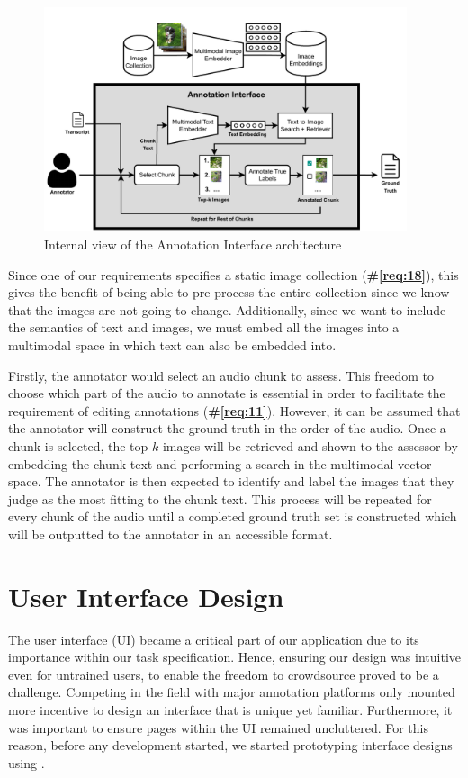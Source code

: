 \documentclass{l4proj}
\begin{document}
\begin{figure}[h]
    \centering
    \includegraphics[width=0.95\textwidth]{figures/annotation_interface.pdf}
    \caption{Internal view of the Annotation Interface architecture}
    \label{fig:annotation_interface}
\end{figure}

Since one of our requirements specifies a static image collection (\textbf{\#\ref{req:18}}), this gives the benefit of being able to pre-process the entire collection since we know that the images are not going to change. Additionally, since we want to include the semantics of text and images, we must embed all the images into a multimodal space in which text can also be embedded into.

Firstly, the annotator would select an audio chunk to assess. This freedom to choose which part of the audio to annotate is essential in order to facilitate the requirement of editing annotations (\textbf{\#\ref{req:11}}). However, it can be assumed that the annotator will construct the ground truth in the order of the audio. Once a chunk is selected, the top-$k$ images will be retrieved and shown to the assessor by embedding the chunk text and performing a search in the multimodal vector space. The annotator is then expected to identify and label the images that they judge as the most fitting to the chunk text. This process will be repeated for every chunk of the audio until a completed ground truth set is constructed which will be outputted to the annotator in an accessible format.


\section{User Interface Design}
The user interface (UI) became a critical part of our application due to its importance within our task specification. Hence, ensuring our design was intuitive even for untrained users, to enable the freedom to crowdsource proved to be a challenge. Competing in the field with major annotation platforms only mounted more incentive to design an interface that is unique yet familiar. Furthermore, it was important to ensure pages within the UI remained uncluttered. For this reason, before any development started, we started prototyping interface designs using \cite{figma}.
\end{document}
